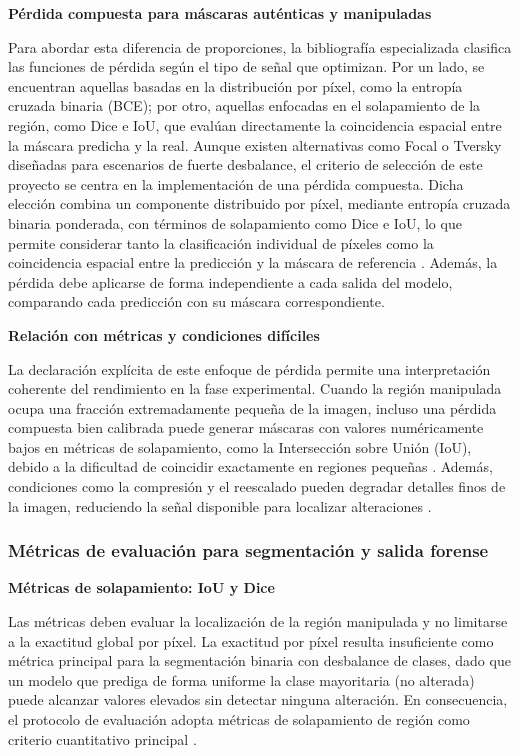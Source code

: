 \medskip\textbf{Pérdida compuesta para máscaras auténticas y manipuladas}

Para abordar esta diferencia de proporciones, la bibliografía especializada clasifica las funciones de pérdida según el tipo de señal que optimizan. Por un lado, se encuentran aquellas basadas en la distribución por píxel, como la entropía cruzada binaria (BCE); por otro, aquellas enfocadas en el solapamiento de la región, como Dice e IoU, que evalúan directamente la coincidencia espacial entre la máscara predicha y la real. Aunque existen alternativas como Focal o Tversky diseñadas para escenarios de fuerte desbalance, el criterio de selección de este proyecto se centra en la implementación de una pérdida compuesta. Dicha elección combina un componente distribuido por píxel, mediante entropía cruzada binaria ponderada, con términos de solapamiento como Dice e IoU, lo que permite considerar tanto la clasificación individual de píxeles como la coincidencia espacial entre la predicción y la máscara de referencia \parencite{Azad2023}. Además, la pérdida debe aplicarse de forma independiente a cada salida del modelo, comparando cada predicción con su máscara correspondiente.

\medskip\textbf{Relación con métricas y condiciones difíciles}

La declaración explícita de este enfoque de pérdida permite una interpretación coherente del rendimiento en la fase experimental. Cuando la región manipulada ocupa una fracción extremadamente pequeña de la imagen, incluso una pérdida compuesta bien calibrada puede generar máscaras con valores numéricamente bajos en métricas de solapamiento, como la Intersección sobre Unión (IoU), debido a la dificultad de coincidir exactamente en regiones pequeñas \parencite{Azad2023}. Además, condiciones como la compresión y el reescalado pueden degradar detalles finos de la imagen, reduciendo la señal disponible para localizar alteraciones \parencite{Gao2024, LiM2025}.

\subsubsection{Métricas de evaluación para segmentación y salida forense}

\medskip\textbf{Métricas de solapamiento: IoU y Dice}

Las métricas deben evaluar la localización de la región manipulada y no limitarse a la exactitud global por píxel. La exactitud por píxel resulta insuficiente como métrica principal para la segmentación binaria con desbalance de clases, dado que un modelo que prediga de forma uniforme la clase mayoritaria (no alterada) puede alcanzar valores elevados sin detectar ninguna alteración. En consecuencia, el protocolo de evaluación adopta métricas de solapamiento de región como criterio cuantitativo principal \parencite{Azad2023, Seghier2024}.


